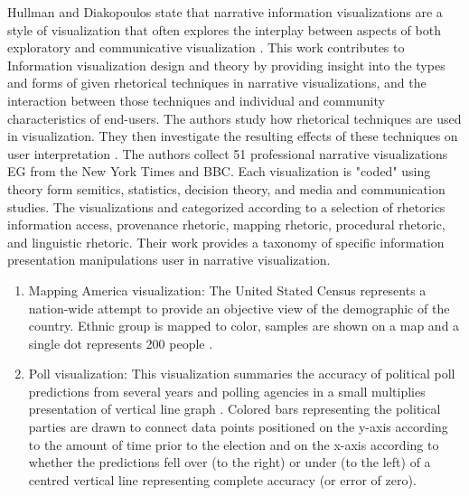 \documentclass{egpubl}
\begin{document}
Hullman and Diakopoulos state that narrative information visualizations are a style of visualization that often explores the interplay between aspects of both exploratory and communicative visualization \cite{hullman}.
This work contributes to Information visualization  design and theory by providing insight into the types and forms of given rhetorical techniques in narrative visualizations, and the interaction between those techniques and individual and community characteristics of end-users. The authors study how rhetorical techniques are used in visualization. They then investigate the resulting effects of these techniques on user interpretation \cite{hullman}.
The authors collect 51 professional narrative visualizations EG from the New York Times and BBC. Each visualization is "coded" using theory form semitics, statistics, decision theory, and media and communication studies. The visualizations and categorized according to a selection of rhetorics information access, provenance rhetoric, mapping rhetoric, procedural rhetoric, and linguistic rhetoric. Their work provides a taxonomy of specific information presentation manipulations user in narrative visualization.
\begin{enumerate}
\item Mapping America visualization: The United Stated Census represents a nation-wide attempt to provide an objective view of the demographic of the country. Ethnic group is mapped to color, samples are shown on a map and a single dot represents 200 people \cite{Bloch}.
\item Poll visualization: This visualization summaries the accuracy of political poll predictions from several years and polling agencies in a small multiplies presentation of vertical line graph \cite{McCandless}. Colored bars representing the political parties are drawn to connect data points positioned on the y-axis according to the amount of time prior to the election and on the x-axis according to whether the predictions fell over (to the right) or under (to the left) of a centred vertical line representing complete accuracy (or error of zero). 
\end{enumerate}
\end{document}
